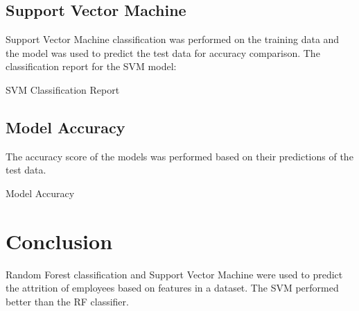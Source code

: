 \documentclass{homework}
\begin{document}
\subsection{Support Vector Machine}

Support Vector Machine classification was performed on the training data and the model was used to predict the test data for accuracy comparison. The classification report for the SVM model: 

\begin{table}[h]
    \caption{SVM Classification Report}
    \label{Unprocessed Data}
    \centering
    
\end{table}

\subsection{Model Accuracy}

The accuracy score of the models was performed based on their predictions of the test data. 

\begin{table}[h]
    \caption{Model Accuracy}
    \label{Unprocessed Data}
    \centering
    
\end{table}

\section{Conclusion}

Random Forest classification and Support Vector Machine were used to predict the attrition of employees based on features in a dataset. The SVM performed better than the RF classifier. 
\end{document}

